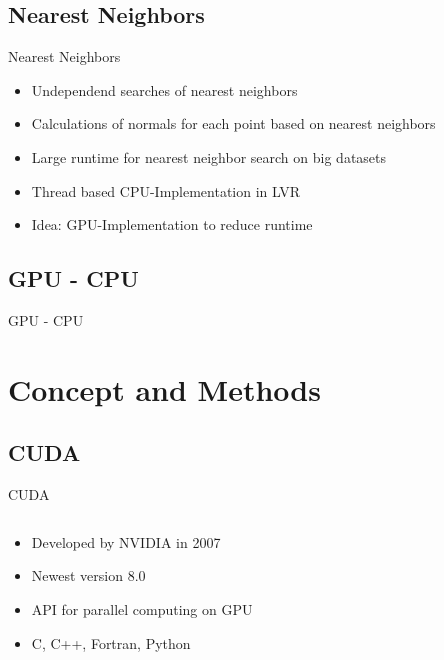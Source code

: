 \documentclass{beamer}
\begin{document}
\subsection*{Nearest Neighbors}
\begin{frame}{Nearest Neighbors}
 
 \begin{itemize}
  \item Undependend searches of nearest neighbors
  \item Calculations of normals for each point based on nearest neighbors
  \item Large runtime for nearest neighbor search on big datasets
  \item Thread based CPU-Implementation in LVR
  \item Idea: GPU-Implementation to reduce runtime
 \end{itemize}

 
\end{frame}

\subsection*{GPU - CPU}
\begin{frame}{GPU - CPU}
\end{frame}

\section{Concept and Methods}

\subsection*{CUDA}
\begin{frame}{CUDA}

 \begin{columns}
  
   \begin{column}{0.55\textwidth}
    
  

 \begin{itemize}
  \item Developed by NVIDIA in 2007
  \item Newest version 8.0
  \item API for parallel computing on GPU
  \item C, C++, Fortran, Python
 \end{itemize}
 
  \end{column}
  \begin{column}{0.45\textwidth}
  \end{column}
 \end{columns}


\end{frame}
\end{document}
